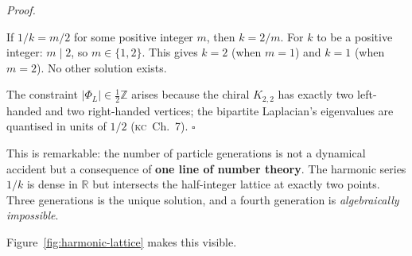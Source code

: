 \documentclass[11pt, a4paper, openany]{book}
\newcommand{\KC}[1]{\textnormal{(\textsc{kc}~#1)}}
\renewenvironment{proof}[1][Proof]{%
  \par\noindent\textit{#1.}\quad
}{\hfill$\square$\par\medskip}
\begin{document}
\begin{proof}
If $1/k = m/2$ for some positive integer $m$, then $k = 2/m$.
For $k$ to be a positive integer: $m \mid 2$, so $m \in \{1, 2\}$.
This gives $k = 2$ (when $m = 1$) and $k = 1$ (when $m = 2$).
No other solution exists.

\smallskip\noindent
The constraint $|\Phi_L| \in \tfrac{1}{2}\mathbb{Z}$ arises because
the chiral $K_{2,2}$ has exactly two left-handed and two right-handed
vertices; the bipartite Laplacian's eigenvalues are quantised in units
of $1/2$ \KC{Ch.~7}.
\end{proof}

\noindent
This is remarkable: the number of particle generations is not a
dynamical accident but a consequence of \textbf{one line of number
theory}.  The harmonic series $1/k$ is dense in $\mathbb{R}$ but
intersects the half-integer lattice at exactly two points.  Three
generations is the unique solution, and a fourth generation is
\emph{algebraically impossible}.

Figure~\ref{fig:harmonic-lattice} makes this visible.
\end{document}

